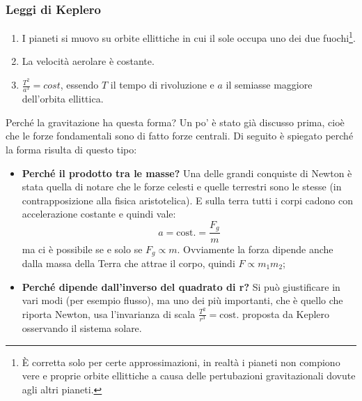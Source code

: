 \documentclass[Main.tex]{subfiles}
\begin{document}
\noindent
\subsubsection{Leggi di Keplero}
\begin{enumerate}
	\item I pianeti si muovo su orbite ellittiche in cui il sole occupa uno dei due fuochi\footnote{È corretta solo per certe approssimazioni, in realtà i pianeti non compiono vere e proprie orbite ellittiche a causa delle pertubazioni gravitazionali dovute agli altri pianeti.}.
	\item La velocità aerolare è costante.
	\item $\frac{T^2}{a^3}=cost$, essendo $T$ il tempo di rivoluzione e $a$ il semiasse maggiore dell'orbita ellittica. 
\end{enumerate}

Perché la gravitazione ha questa forma? Un po' è stato già discusso prima, cioè che le forze fondamentali sono di fatto forze centrali. Di seguito è spiegato perché la forma risulta di questo tipo:
\begin{itemize}
	\item \textbf{Perché il prodotto tra le masse?} Una delle grandi conquiste di Newton è stata quella di notare che le forze celesti e quelle terrestri sono le stesse (in contrapposizione alla fisica aristotelica). E sulla terra tutti i corpi cadono con accelerazione costante e quindi vale:
	$$
	a=\text{cost.}=\frac{F_g}{m}
	$$
	ma ci è possibile se e solo se $F_g \propto m$. Ovviamente la forza dipende anche dalla massa della Terra che attrae il corpo, quindi $F \propto m_1 m_2$;
	\item \textbf{Perché dipende dall'inverso del quadrato di r?} Si può giustificare in vari modi (per esempio flusso), ma uno dei più importanti, che è quello che riporta Newton, usa l'invarianza di scala $\frac{T^2}{r^3}=\text{cost.}$ proposta da Keplero osservando il sistema solare.

\end{itemize}
\end{document}
